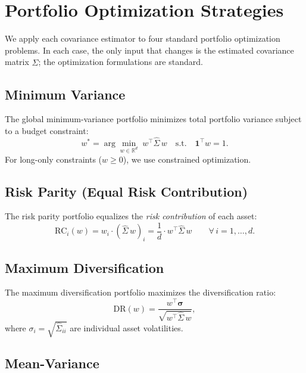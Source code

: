 \documentclass[12pt,a4paper]{article}
\newcommand{\R}{\mathbb{R}}
\begin{document}
\section{Portfolio Optimization Strategies}\label{sec:strategies}

We apply each covariance estimator to four standard portfolio
optimization problems. In each case, the only input that changes
is the estimated covariance matrix $\hat{\Sigma}$; the optimization
formulations are standard.

\subsection{Minimum Variance}

The global minimum-variance portfolio minimizes total portfolio variance
subject to a budget constraint:
\begin{equation}\label{eq:minvar}
    w^* = \arg\min_{w \in \R^d} \; w^\top \hat{\Sigma}\, w
    \quad \text{s.t.} \quad \mathbf{1}^\top w = 1.
\end{equation}
For long-only constraints ($w \geq 0$), we use constrained optimization.

\subsection{Risk Parity (Equal Risk Contribution)}

The risk parity portfolio \citep{Maillard2010} equalizes the
\emph{risk contribution} of each asset:
\begin{equation}
    \text{RC}_i(w) = w_i \cdot (\hat{\Sigma}\, w)_i = \frac{1}{d}
    \cdot w^\top \hat{\Sigma}\, w \qquad \forall\, i = 1, \ldots, d.
\end{equation}

\subsection{Maximum Diversification}

The maximum diversification portfolio \citep{Choueifaty2008} maximizes the
diversification ratio:
\begin{equation}
    \text{DR}(w) = \frac{w^\top \bm{\sigma}}
    {\sqrt{w^\top \hat{\Sigma}\, w}},
\end{equation}
where $\sigma_i = \sqrt{\hat{\Sigma}_{ii}}$ are individual asset volatilities.

\subsection{Mean-Variance}
\end{document}

